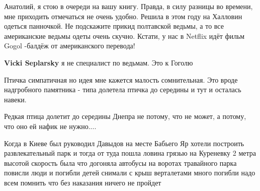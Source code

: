 \begin{itemize}

Анатолий, я стою в очереди на вашу книгу. Правда, в силу разницы во времени,
мне приходить отмечаться не очень удобно. Решила в этом году на Халловин
одеться панночкой. Не подскажите прикид полтавской ведьмы, а то все
американские ведьмы одеты очень скучно.  Кстати, у нас в Netflix идёт фильм
Gogol -балдёж от американского перевода!

\textbf{Vicki Seplarsky} я не специалист по ведьмам. Это к Гоголю


Птичка симпатичная но идея мне кажется малость сомнительная. Это вроде
надгробного памятника - типа долетела птичка до середины и тут и осталась
навеки.


Редкая птица долетит до середины Днепра не потому, что не может, а потому, что
оно ей нафик не нужно....


Когда в Киеве был руководил Давыдов на месте Бабьего Яр хотели построить
развлекательный парк и тогда от туда пошла ловина грязью на Куреневку 2 метра
высотой скорость была что догоняла автобусы на воротах травайного парка повисли
люди и погибли детей снимали с крыш верталетами много погибли надо всем помнить
что без наказания ничего не пройдет


\end{itemize} %
